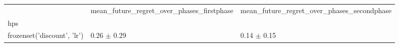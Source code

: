 \begin{tabular}{lll}
\toprule
 & mean_future_regret_over_phases_firstphase & mean_future_regret_over_phases_secondphase \\
hps &  &  \\
\midrule
frozenset({'discount', 'lr'}) & 0.26 $\pm$ 0.29 & 0.14 $\pm$ 0.15 \\
\bottomrule
\end{tabular}
